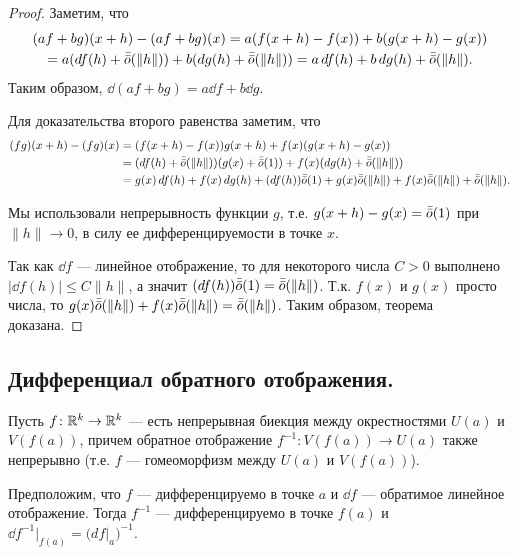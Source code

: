 \documentclass[a4paper]{article}
\theoremstyle{named}
\begin{document}
    \begin{proof}
        Заметим, что
        \begin{multline*}
            (af+bg)(x+h) - (af + bg)(x) = a(f(x+h) - f(x)) + b(g(x+h) - g(x))\\
            = a(\mathop{}\!d f(h) + \bar{\bar{o}}(\|h\|)) + b(\mathop{}\!d g (h) + \bar{\bar{o}}(\|h\|))
            = a\mathop{}\!d f(h) + b\mathop{}\!d g(h) + \bar{\bar{o}}(\|h\|).
        \end{multline*}
        Таким образом, $\dd(af + bg) = a\dd f +b\dd g$.

        Для доказательства второго равенства заметим, что
        \begin{align*}
            (fg)(x+h) - (fg)(x) 
            &= (f(x+h) - f(x))g(x+h) + f(x)(g(x+h) - g(x)) \\
            &= (\mathop{}\!d f(h) + \bar{\bar{o}}(\|h\|))(g(x) +\bar{\bar{o}}(1)) + f(x)(\mathop{}\!d g (h) + \bar{\bar{o}}(\|h\|)) \\
            &= g(x)\mathop{}\!d f(h) + f(x)\mathop{}\!d g(h) + (\mathop{}\!d f(h))\bar{\bar{o}}(1) + g(x)\bar{\bar{o}}(\|h\|)+ f(x)\bar{\bar{o}}(\|h\|) + \bar{\bar{o}}(\|h\|).
        \end{align*}

        Мы использовали непрерывность функции $g$, т.е. $g(x+h)-g(x) = \bar{\bar{o}}(1)$ при $\|h\| \to 0$,
        в силу ее дифференцируемости в точке $x$.

        Так как $\dd f$ --- линейное отображение, то для некоторого числа $C>0$ выполнено $|\dd f(h)|\leq C\|h\|$, а значит $(\mathop{}\!d f(h))\bar{\bar{o}}(1) = \bar{\bar{o}}(\|h\|)$.
        Т.к. $f(x)$ и $g(x)$ просто числа, то $ g(x)\bar{\bar{o}}(\|h\|)+ f(x)\bar{\bar{o}}(\|h\|) = \bar{\bar{o}}(\|h\|)$.
        Таким образом, теорема доказана.
    \end{proof}

    \subsection{Дифференциал обратного отображения.}

    \begin{theorem*}
        Пусть $f\colon \mathbb{R}^k\to \mathbb{R}^k$ --- есть непрерывная биекция между окрестностями $U(a)$ и $V(f(a))$,
        причем обратное отображение $f^{-1}\colon V(f(a))\to U(a)$ также непрерывно (т.е. $f$ --- гомеоморфизм между $U(a)$ и $V(f(a))$).

        Предположим, что $f$ --- дифференцируемо в точке $a$ и $\dd f$ --- обратимое линейное отображение.
        Тогда $f^{-1}$ --- дифференцируемо в точке $f(a)$ и $\dd f^{-1}\bigl|_{f(a)} = \bigr(df\bigl|_a\bigl)^{-1}$.
    \end{theorem*}
\end{document}
